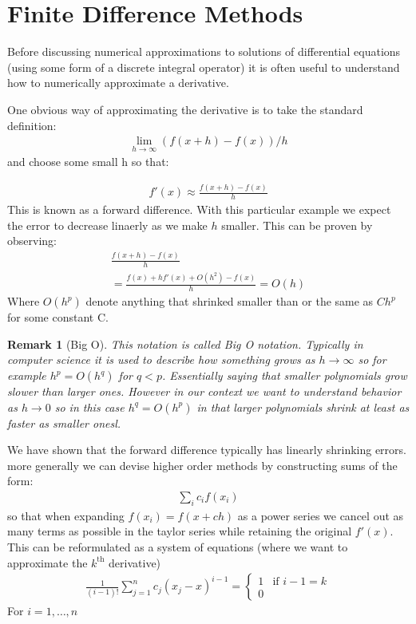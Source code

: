 \documentclass[12pt]{article}
\newtheorem*{remark}{Remark}
\begin{document}
\section{Finite Difference Methods}
Before discussing numerical approximations to solutions of differential equations (using some form of a discrete integral operator) it is often useful to understand how to numerically approximate a derivative.

One obvious way of approximating the derivative is to take the standard definition:
\begin{align}
	\lim_{h\rightarrow \infty} (f(x+h)-f(x))/h
\end{align}
and choose some small h so that:


\begin{align}
	f'(x)\approx \frac{f(x+h)-f(x)}{h}
\end{align}
This is known as a forward difference. With this particular example we expect the error to decrease linaerly as we make $h$ smaller. This can be proven by observing:
\begin{align}
	\frac{f(x+h)-f(x)}{h} \\
	=\frac{f(x)+hf'(x)+O(h^2)-f(x)}{h}=O(h)
\end{align}
Where $O(h^p)$ denote anything that shrinked smaller than or the same as $Ch^p$ for some constant C.

\begin{remark}[Big O]

	This notation is called Big O notation. Typically in computer science it is used to describe how something grows as $h\rightarrow \infty$ so for example $h^p=O(h^q)$ for $q<p$. Essentially saying that smaller polynomials grow slower than larger ones. However in our context we want to understand behavior as $h\rightarrow 0$ so in this case $h^q=O(h^p)$ in that larger polynomials shrink at least as faster as smaller onesl.
\end{remark}
We have shown that the forward difference typically has linearly shrinking errors. more generally we can devise higher order methods by constructing sums of the form:
\begin{align}
	\sum_i c_if(x_i)
\end{align}
so that when expanding $f(x_i)=f(x+ch)$ as a power series we cancel out as many terms as possible in the taylor series while retaining the original $f'(x)$. This can be reformulated as a system of equations (where we want to approximate the $k^\text{th}$ derivative)
\begin{align}
	\frac{1}{(i-1)!}\sum_{j=1}^nc_j(x_j-x)^{i-1}=\begin{cases}
		                                             1 & \text{if }i-1=k \\
		                                             0
	                                             \end{cases}
\end{align}
For $i=1,\dots,n$
\end{document}
